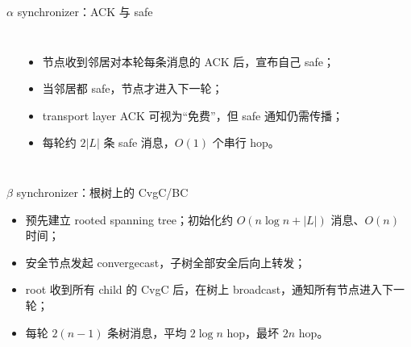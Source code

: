 \documentclass[UTF8,fontset=none,aspectratio=169,10pt]{beamer}
\begin{document}
{\begin{frame}{$\alpha$ synchronizer：ACK 与 safe}
\begin{columns}[T,onlytextwidth]
\begin{center}
\end{center}
\begin{itemize}
  \item 节点收到邻居对本轮每条消息的 ACK 后，宣布自己 safe；
  \item 当邻居都 safe，节点才进入下一轮；
  \item transport layer ACK 可视为“免费”，但 safe 通知仍需传播；
  \item 每轮约 $2|L|$ 条 safe 消息，$O(1)$ 个串行 hop。
\end{itemize}
\end{columns}
\end{frame}

\begin{frame}{$\beta$ synchronizer：根树上的 CvgC/BC}
\begin{itemize}
  \item 预先建立 rooted spanning tree；初始化约 $O(n\log n+|L|)$ 消息、$O(n)$ 时间；
  \item 安全节点发起 convergecast，子树全部安全后向上转发；
  \item root 收到所有 child 的 CvgC 后，在树上 broadcast，通知所有节点进入下一轮；
  \item 每轮 $2(n-1)$ 条树消息，平均 $2\log n$ hop，最坏 $2n$ hop。
\end{itemize}
\end{frame}

}
\end{document}

